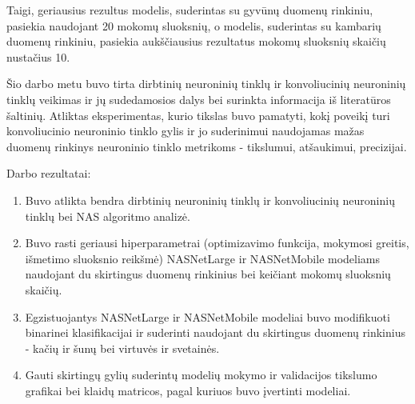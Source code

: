 \documentclass{VUMIFPSbakalaurinis}
\begin{document}
Taigi, geriausius rezultus modelis, suderintas su gyvūnų duomenų rinkiniu, pasiekia naudojant 20 mokomų sluoksnių, o modelis, suderintas su kambarių duomenų rinkiniu, pasiekia aukščiausius rezultatus mokomų sluoksnių skaičių nustačius 10.

Šio darbo metu buvo tirta dirbtinių neuroninių tinklų ir konvoliucinių neuroninių tinklų veikimas 
ir jų sudedamosios dalys bei surinkta informacija iš literatūros šaltinių. Atliktas eksperimentas, 
kurio tikslas buvo pamatyti, kokį poveikį turi konvoliucinio neuroninio tinklo gylis ir jo suderinimui 
naudojamas mažas duomenų rinkinys neuroninio tinklo metrikoms - tikslumui, atšaukimui, precizijai.

Darbo rezultatai:
\begin{enumerate}
    \item Buvo atlikta bendra dirbtinių neuroninių tinklų ir konvoliucinių neuroninių tinklų bei NAS algoritmo analizė.
    \item Buvo rasti geriausi hiperparametrai (optimizavimo funkcija, mokymosi greitis, išmetimo sluoksnio reikšmė) NASNetLarge ir NASNetMobile modeliams naudojant du skirtingus duomenų rinkinius bei keičiant mokomų sluoksnių skaičių.
    \item Egzistuojantys NASNetLarge ir NASNetMobile modeliai buvo modifikuoti binarinei klasifikacijai ir suderinti naudojant du skirtingus duomenų rinkinius - kačių ir šunų bei virtuvės ir svetainės.
    \item Gauti skirtingų gylių suderintų modelių mokymo ir validacijos tikslumo grafikai bei klaidų matricos, pagal kuriuos buvo įvertinti modeliai.
\end{enumerate}
\end{document}
